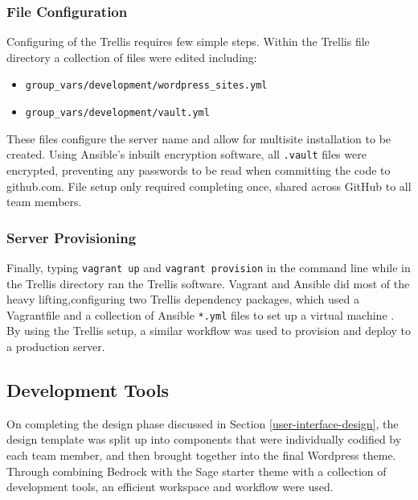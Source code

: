 \documentclass[fontsize=11pt]{extarticle}
\numberwithin{figure}{section} %
\providecommand{\tightlist}{%
  \setlength{\itemsep}{0pt}\setlength{\parskip}{0pt}}
\begin{document}
\hypertarget{file-configuration}{%
\subsubsection{File Configuration}\label{file-configuration}}

Configuring of the Trellis requires few simple steps. Within the Trellis
file directory a collection of files were edited including:

\begin{itemize}
\tightlist
\item
  \texttt{group\_vars/development/wordpress\_sites.yml}
\item
  \texttt{group\_vars/development/vault.yml}
\end{itemize}

These files configure the server name and allow for multisite
installation to be created. Using Ansible's inbuilt encryption software,
all \texttt{.vault} files were encrypted, preventing any passwords to be
read when committing the code to github.com. File setup only required
completing once, shared across GitHub to all team members.

\hypertarget{server-provisioning}{%
\subsubsection{Server Provisioning}\label{server-provisioning}}

Finally, typing \texttt{vagrant\ up} and \texttt{vagrant\ provision} in
the command line while in the Trellis directory ran the Trellis
software. Vagrant and Ansible did most of the heavy lifting,configuring
two Trellis dependency packages, which used a Vagrantfile and a
collection of Ansible \texttt{*.yml} files to set up a virtual machine
\cite{p22}. By using the Trellis setup, a similar workflow was used to
provision and deploy to a production server.

\hypertarget{development-tools}{%
\subsection{Development Tools}\label{development-tools}}

On completing the design phase discussed in Section
\ref{user-interface-design}, the design template was split up into
components that were individually codified by each team member, and then
brought together into the final Wordpress theme. Through combining
Bedrock with the Sage starter theme with a collection of development
tools, an efficient workspace and workflow were used.
\end{document}
